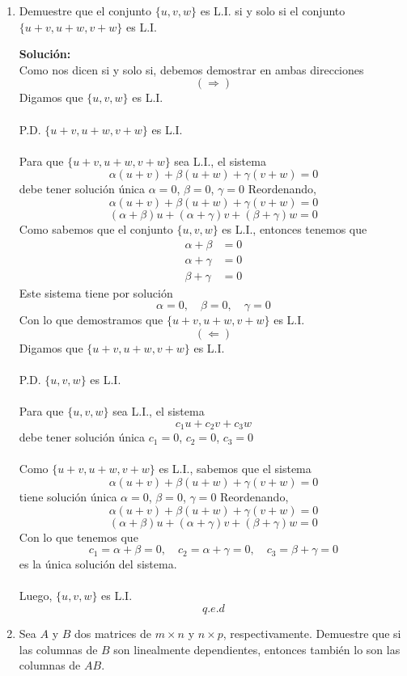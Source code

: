 \documentclass[12pt]{article}
\newenvironment{solucion}
{\begin{mdframed}[backgroundcolor=black!10]
		{\bf Solución:}\\
	}
	{
	\end{mdframed}
}
\newenvironment{preguntas}
{\begin{enumerate}\itemsep12pt
	}
	{
	\end{enumerate}
}
\begin{document}
\begin{preguntas}
\begin{solucion}
\end{solucion}
\item Demuestre que el conjunto $\{u, v, w\}$ es L.I. si y solo si el conjunto $\{u+v, u+w, v+w\}$ es L.I.
\begin{solucion}
Como nos dicen si y solo si, debemos demostrar en ambas direcciones
		$$(\Longrightarrow)$$
		Digamos que $\{u, v, w\}$ es L.I.\\
		\\
		P.D. $\{u+v, u+w, v+w\}$ es L.I.\\
		\\
		Para que $\{u+v, u+w, v+w\}$ sea L.I., el sistema
		$$\alpha (u+v) + \beta (u+w) + \gamma (v+w) = 0$$
		debe tener solución única $\alpha = 0$, $\beta = 0$, $\gamma = 0$
		Reordenando,
		$$\alpha (u+v) + \beta (u+w) + \gamma (v+w) = 0$$
		$$(\alpha + \beta) u + (\alpha + \gamma) v + (\beta + \gamma) w = 0$$
		Como sabemos que el conjunto $\{u, v, w\}$ es L.I., entonces tenemos que
		$$\begin{array}{rl}
		\alpha + \beta & = 0\\
		\alpha + \gamma & = 0\\
		\beta + \gamma & = 0
		\end{array}$$
		Este sistema tiene por solución
		$$\alpha = 0, \quad \beta = 0, \quad \gamma = 0$$
		Con lo que demostramos que $\{u+v, u+w, v+w\}$ es L.I.
		$$(\Longleftarrow)$$
		Digamos que $\{u+v, u+w, v+w\}$ es L.I.\\
		\\
		P.D. $\{u, v, w\}$ es L.I.\\
		\\
		Para que $\{u, v, w\}$ sea L.I., el sistema
		$$c_1u + c_2v + c_3w$$
		debe tener solución única $c_1 = 0$, $c_2 = 0$, $c_3 = 0$\\
		\\
		Como $\{u+v, u+w, v+w\}$ es L.I., sabemos que el sistema
		$$\alpha (u+v) + \beta (u+w) + \gamma (v+w) = 0$$
		tiene solución única $\alpha = 0$, $\beta = 0$, $\gamma = 0$
		Reordenando,
		$$\alpha (u+v) + \beta (u+w) + \gamma (v+w) = 0$$
		$$(\alpha + \beta) u + (\alpha + \gamma) v + (\beta + \gamma) w = 0$$
		Con lo que tenemos que
		$$c_1 = \alpha + \beta = 0, \quad c_2 = \alpha + \gamma = 0, \quad c_3 = \beta + \gamma = 0$$
		es la única solución del sistema. \\
		\\
		Luego, $\{u, v, w\}$ es L.I.
		$$q.e.d$$
\end{solucion}
\item Sea $A$ y $B$ dos matrices de $m\times n$ y $n \times p$, respectivamente. Demuestre que si las columnas de $B$ son linealmente dependientes, entonces también lo son las columnas de $AB$.

\end{preguntas}
\end{document}
